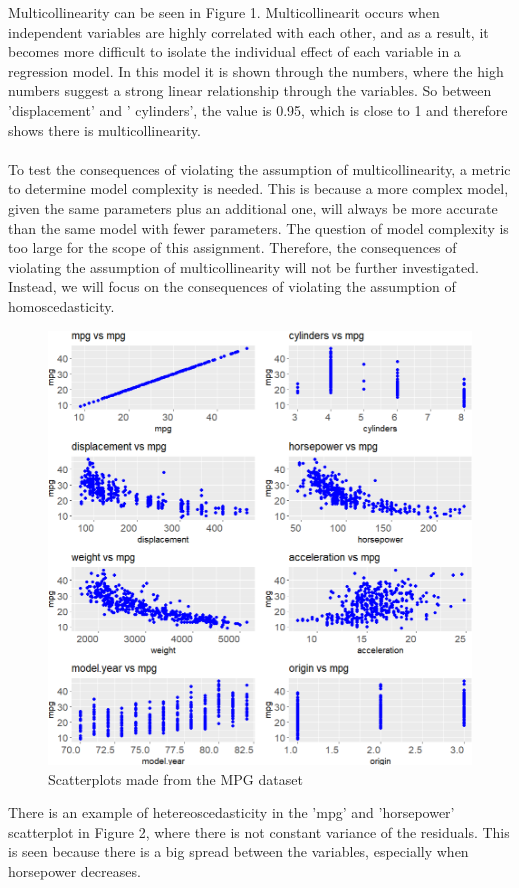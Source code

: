\noindent Multicollinearity can be seen in Figure 1. Multicollinearit occurs when independent variables are highly correlated with each other, and as a result, it becomes more difficult to isolate the individual effect of each variable in a regression model.
In this model it is shown through the numbers, where the high numbers suggest a strong linear relationship through the variables. So between 'displacement' and ' cylinders', the value is 0.95, which is close to 1 and therefore shows there is multicollinearity.
\noindent\\\\
 To test the consequences of violating the assumption of multicollinearity, a metric to determine model complexity is needed. This is because a more complex model, given the same parameters plus an additional one, will always be more accurate than the same model with fewer parameters. The question of model complexity is too large for the scope of this assignment. Therefore, the consequences of violating the assumption of multicollinearity will not be further investigated. Instead, we will focus on the consequences of violating the assumption of homoscedasticity. \newline

\begin{figure}[h]
	\includegraphics[width=\linewidth]{billder/2.png}
	\caption{Scatterplots made from the MPG dataset}
	\label{fig:2}
\end{figure}
\noindent There is an example of hetereoscedasticity in the 'mpg' and 'horsepower' scatterplot in Figure 2, where there is not constant variance of the residuals. This is seen because there is a big spread between the variables, especially when horsepower decreases.   

